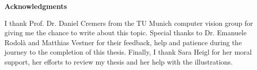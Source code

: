 \clearemptydoublepage
{}
{}	



\vspace*{2cm}

\begin{center}
{\Large \bfseries Acknowledgments}
\end{center}

\vspace{1cm}




I thank Prof. Dr. Daniel Cremers from the TU Munich computer vision group for giving me the chance to write about this topic.
Special thanks to Dr. Emanuele Rodol\`{a} and Matthias Vestner for their feedback, help and patience during the journey to the completion of this thesis.
Finally, I thank Sara Heigl for her moral support, her efforts to review my thesis and her help with the illustrations.

